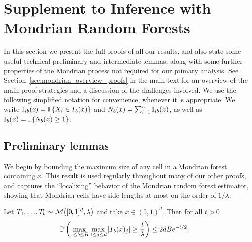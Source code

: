 
\chapter{Supplement to Inference with Mondrian Random Forests}
\label{app:mondrian}

In this section we present the full proofs of all our results,
and also state some useful technical preliminary and
intermediate lemmas, along with some further properties
of the Mondrian process not required for our primary analysis.
See Section~\ref{sec:mondrian_overview_proofs} in the main text
for an overview of the main proof strategies and a discussion of
the challenges involved.
We use the following simplified notation for convenience,
whenever it is appropriate.
We write $\I_{i b}(x) = \I \left\{ X_i \in T_b(x) \right\}$
and $N_b(x) = \sum_{i=1}^{n} \I_{i b}(x)$,
as well as $\I_b(x) = \I \left\{ N_b(x) \geq 1 \right\}$.

\section{Preliminary lemmas}

We begin by bounding the maximum size of any cell
in a Mondrian forest containing $x$.
This result is used regularly throughout many of our other proofs,
and captures the ``localizing'' behavior of the Mondrian random
forest estimator, showing that Mondrian cells have side lengths
at most on the order of $1/\lambda$.

\begin{lemma}%
  \label{lem:mondrian_app_largest_cell}
  Let $T_1, \ldots, T_b \sim \cM\big([0,1]^d, \lambda\big)$
  and take $x \in (0,1)^d$. Then for all $t > 0$
  \begin{align*}
    \P \left(
      \max_{1 \leq b \leq B}
      \max_{1 \leq j \leq d}
      |T_b(x)_j|
      \geq \frac{t}{\lambda}
    \right)
    &\leq
    2dB e^{-t/2}.
  \end{align*}

\end{lemma}

